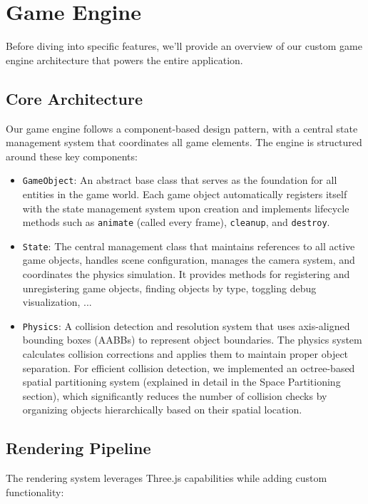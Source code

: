 \documentclass{article}
\begin{document}
\section{Game Engine}
Before diving into specific features, we'll provide an overview of our custom game engine architecture that powers the entire application.

\subsection{Core Architecture}
Our game engine follows a component-based design pattern, with a central state management system that coordinates all game elements. The engine is structured around these key components:

\begin{itemize}
    \item \texttt{GameObject}: An abstract base class that serves as the foundation for all entities in the game world. Each game object automatically registers itself with the state management system upon creation and implements lifecycle methods such as \texttt{animate} (called every frame), \texttt{cleanup}, and \texttt{destroy}.
    
    \item \texttt{State}: The central management class that maintains references to all active game objects, handles scene configuration, manages the camera system, and coordinates the physics simulation. It provides methods for registering and unregistering game objects, finding objects by type, toggling debug visualization, ...
    
    \item \texttt{Physics}: A collision detection and resolution system that uses axis-aligned bounding boxes (AABBs) to represent object boundaries. The physics system calculates collision corrections and applies them to maintain proper object separation. For efficient collision detection, we implemented an octree-based spatial partitioning system (explained in detail in the Space Partitioning section), which significantly reduces the number of collision checks by organizing objects hierarchically based on their spatial location.
\end{itemize}

\subsection{Rendering Pipeline}
The rendering system leverages Three.js capabilities while adding custom functionality:
\end{document}
